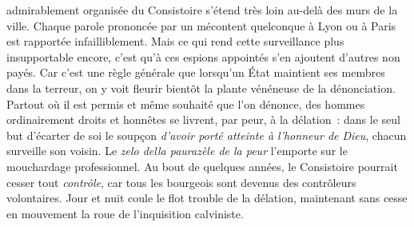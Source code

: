 \documentclass[french,twoside]{book} %
\newcommand\foreign[1]{\emph{#1}}
\begin{document}
admirablement organisée du Consistoire s’étend très loin au-delà des murs de la ville. Chaque parole prononcée par un mécontent quelconque à Lyon ou à Paris est rapportée infailliblement. Mais ce qui rend cette surveillance plus insupportable encore, c’est qu’à ces espions appointés s’en ajoutent d’autres non payés. Car c’est une règle générale que lorsqu’un État maintient ses membres dans la terreur, on y voit fleurir bientôt la plante vénéneuse de la dénonciation. Partout où il est permis et même souhaité que l’on dénonce, des hommes ordinairement droits et honnêtes se livrent, par peur, à la délation : dans le seul but d’écarter de soi le soupçon \emph{d’avoir porté atteinte à l’honneur de Dieu}, chacun surveille son voisin. Le \foreign{zelo della paurazèle de la peur} l’emporte sur le mouchardage professionnel. Au bout de quelques années, le Consistoire pourrait cesser tout \emph{contrôle}, car tous les bourgeois sont devenus des contrôleurs volontaires. Jour et nuit coule le flot trouble de la délation, maintenant sans cesse en mouvement la roue de l’inquisition calviniste.\par
\end{document}

